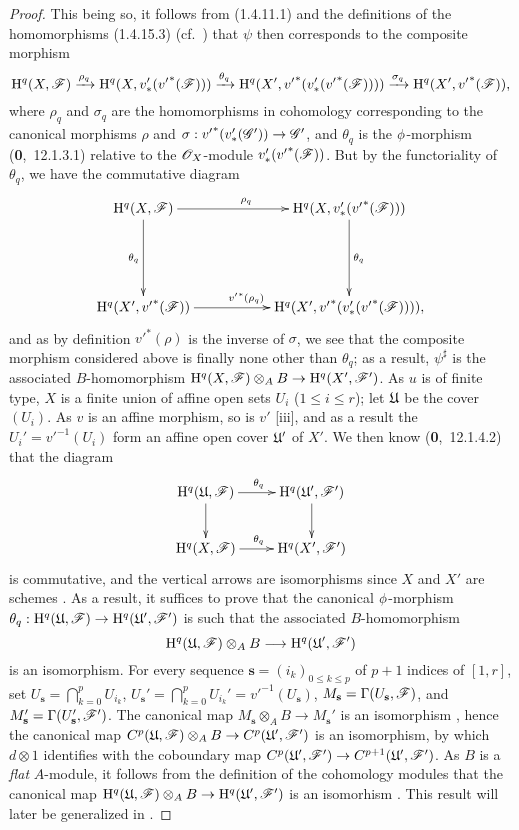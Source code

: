 \begin{proof}
This being so, it follows from (1.4.11.1) and the definitions of the homomorphisms (1.4.15.3) (cf.~) that $\psi$ then corresponds to the composite morphism
\[
  \mathrm{H}^q(X,\mathscr{F})\xrightarrow{\rho_q}\mathrm{H}^q(X,v_*'({v'}^*(\mathscr{F})))\xrightarrow{\theta_q}\mathrm{H}^q(X',{v'}^*(v_*'({v'}^*(\mathscr{F}))))\xrightarrow{\sigma_q}\mathrm{H}^q(X',{v'}^*(\mathscr{F})),
\]
where $\rho_q$ and $\sigma_q$ are the homomorphisms in cohomology corresponding to the canonical morphisms $\rho$ and $\sigma:{v'}^*(v_*'(\sh{G}'))\to\sh{G}'$, and $\theta_q$ is the $\phi$-morphism (\textbf{0},~12.1.3.1) relative to the $\mathscr{O}_X$-module $v_*'({v'}^*(\mathscr{F}))$.
But by the functoriality of $\theta_q$, we have the commutative diagram
\[
  \xymatrix{
    \HH^q(X,\sh{F})\ar[rr]^{\rho_q}\ar[dd]_{\theta_q} & &
    \HH^q(X,v_*'({v'}^*(\sh{F})))\ar[dd]^{\theta_q}\\\\
    \HH^q(X',{v'}^*(\sh{F}))\ar[rr]^{{v'}^*(\rho_q)} & &
    \HH^q(X',{v'}^*(v_*'({v'}^*(\sh{F})))),
  }
\]
and as by definition  ${v'}^*(\rho)$ is the inverse of $\sigma$, we see that the composite morphism considered above is finally none other than $\theta_q$; as a result, $\psi^\sharp$ is the associated $B$-homomorphism $\HH^q(X,\sh{F})\otimes_A B\to\HH^q(X',\sh{F}')$.
As $u$ is of finite type, $X$ is a finite union of affine open sets $U_i$ ($1\leq i\leq r$); let $\mathfrak{U}$ be the cover $(U_i)$.
As $v$ is an affine morphism, so is $v'$ [iii], and as a result the $U_i'={v'}^{-1}(U_i)$ form an affine open cover $\mathfrak{U}'$ of $X'$.
We then know (\textbf{0},~12.1.4.2) that the diagram
\[
  \xymatrix{
    \HH^q(\fk{U},\sh{F})\ar[r]^{\theta_q}\ar[d] &
    \HH^q(\fk{U}',\sh{F}')\ar[d]\\
    \HH^q(X,\sh{F})\ar[r]^{\theta_q} &
    \HH^q(X',\sh{F}')
  }
\]
is commutative, and the vertical arrows are isomorphisms since $X$ and $X'$ are schemes .
As a result, it suffices to prove that the canonical $\phi$-morphism $\theta_q:\HH^q(\fk{U},\sh{F})\to\HH^q(\fk{U}',\sh{F}')$ is such that the associated $B$-homomorphism
\[
  \HH^q(\fk{U},\sh{F})\otimes_A B\to\HH^q(\fk{U}',\sh{F}')
\]
is an isomorphism.
For every sequence $\mathbf{s}=(i_k)_{0\leq k\leq p}$ of $p+1$ indices of $[1,r]$, set $U_\mathbf{s}=\bigcap_{k=0}^p U_{i_k}$, $U_\mathbf{s}'=\bigcap_{k=0}^p U_{i_k}'={v'}^{-1}(U_\mathbf{s})$, $M_\mathbf{s}=\Gamma(U_\mathbf{s},\mathscr{F})$, and $M_\mathbf{s}'=\Gamma(U_\mathbf{s}',\mathscr{F}')$.
The canonical map $M_\mathbf{s}\otimes_A B\to M_\mathbf{s}'$ is an isomorphism , hence the canonical map $C^p(\fk{U},\sh{F})\otimes_A B\to C^p(\fk{U}',\sh{F}')$ is an isomorphism, by which $d\otimes 1$ identifies with the coboundary map $C^p(\fk{U}',\sh{F}')\to C^{p+1}(\fk{U}',\sh{F}')$.
As $B$ is a \emph{flat} $A$-module, it follows from the definition of the cohomology modules that the canonical map $\HH^q(\fk{U},\sh{F})\otimes_A B\to\HH^q(\fk{U}',\sh{F}')$ is an isomorhism .
This result will later be generalized in .
\end{proof}

